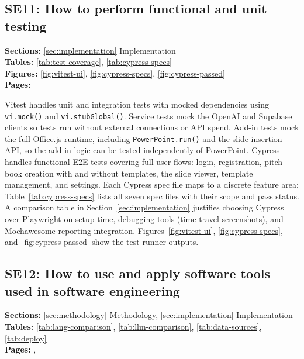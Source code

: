 \subsection*{SE11: How to perform functional and unit testing}

\noindent\textbf{Sections:} \ref{sec:implementation} Implementation\\
\noindent\textbf{Tables:} \ref{tab:test-coverage}, \ref{tab:cypress-specs}\\
\noindent\textbf{Figures:} \ref{fig:vitest-ui}, \ref{fig:cypress-specs}, \ref{fig:cypress-passed}\\
\noindent\textbf{Pages:} \pageref{sec:implementation}

Vitest handles unit and integration tests with mocked dependencies using \texttt{vi.mock()} and \texttt{vi.stubGlobal()}. Service tests mock the OpenAI and Supabase clients so tests run without external connections or API spend. Add-in tests mock the full Office.js runtime, including \texttt{PowerPoint.run()} and the slide insertion API, so the add-in logic can be tested independently of PowerPoint. Cypress handles functional E2E tests covering full user flows: login, registration, pitch book creation with and without templates, the slide viewer, template management, and settings. Each Cypress spec file maps to a discrete feature area; Table~\ref{tab:cypress-specs} lists all seven spec files with their scope and pass status. A comparison table in Section~\ref{sec:implementation} justifies choosing Cypress over Playwright on setup time, debugging tools (time-travel screenshots), and Mochawesome reporting integration. Figures~\ref{fig:vitest-ui}, \ref{fig:cypress-specs}, and~\ref{fig:cypress-passed} show the test runner outputs.

\subsection*{SE12: How to use and apply software tools used in software engineering}

\noindent\textbf{Sections:} \ref{sec:methodology} Methodology, \ref{sec:implementation} Implementation\\
\noindent\textbf{Tables:} \ref{tab:lang-comparison}, \ref{tab:llm-comparison}, \ref{tab:data-sources}, \ref{tab:deploy}\\
\noindent\textbf{Pages:} \pageref{sec:methodology}, \pageref{sec:implementation}

